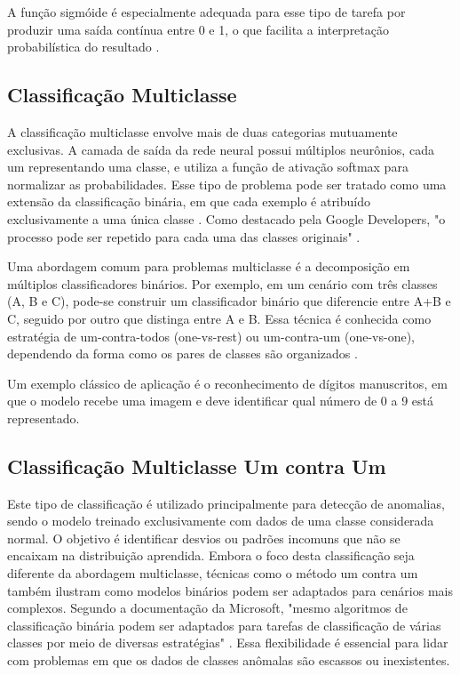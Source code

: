 A função sigmóide é especialmente adequada para esse tipo de tarefa por produzir uma saída contínua entre 0 e 1, o que facilita a interpretação probabilística do resultado .




\subsection{Classificação Multiclasse}

A classificação multiclasse envolve mais de duas categorias mutuamente exclusivas. A camada de saída da rede neural possui múltiplos neurônios, cada um representando uma classe, e utiliza a função de ativação softmax para normalizar as probabilidades. Esse tipo de problema pode ser tratado como uma extensão da classificação binária, em que cada exemplo é atribuído exclusivamente a uma única classe . Como destacado pela Google Developers, "o processo pode ser repetido para cada uma das classes originais" .

Uma abordagem comum para problemas multiclasse é a decomposição em múltiplos classificadores binários. Por exemplo, em um cenário com três classes (A, B e C), pode-se construir um classificador binário que diferencie entre A+B e C, seguido por outro que distinga entre A e B. Essa técnica é conhecida como estratégia de um-contra-todos (one-vs-rest) ou um-contra-um (one-vs-one), dependendo da forma como os pares de classes são organizados .

Um exemplo clássico de aplicação é o reconhecimento de dígitos manuscritos, em que o modelo recebe uma imagem e deve identificar qual número de 0 a 9 está representado.

\subsection{Classificação Multiclasse Um contra Um}

Este tipo de classificação é utilizado principalmente para detecção de anomalias, sendo o modelo treinado exclusivamente com dados de uma classe considerada normal. O objetivo é identificar desvios ou padrões incomuns que não se encaixam na distribuição aprendida. Embora o foco desta classificação seja diferente da abordagem multiclasse, técnicas como o método um contra um também ilustram como modelos binários podem ser adaptados para cenários mais complexos. Segundo a documentação da Microsoft, "mesmo algoritmos de classificação binária podem ser adaptados para tarefas de classificação de várias classes por meio de diversas estratégias" . Essa flexibilidade é essencial para lidar com problemas em que os dados de classes anômalas são escassos ou inexistentes.

